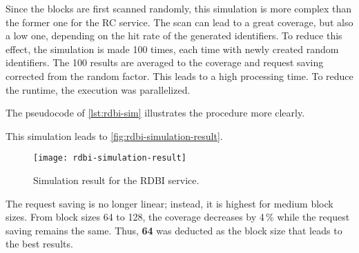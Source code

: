 Since the blocks are first scanned randomly, this simulation is more complex than the former one for the RC service. The scan can lead to a great coverage, but also a low one, depending on the hit rate of the generated identifiers. To reduce this effect, the simulation is made 100 times, each time with newly created random identifiers. The 100 results are averaged to the coverage and request saving corrected from the random factor. This leads to a high processing time. To reduce the runtime, the execution was parallelized.

The pseudocode of \autoref{lst:rdbi-sim} illustrates the procedure more clearly.


This simulation leads to \autoref{fig:rdbi-simulation-result}.

\begin{figure}[htb]
    \centering
    \texttt{[image: rdbi-simulation-result]}
    \caption{Simulation result for the RDBI service.}
    \label{fig:rdbi-simulation-result}
\end{figure}

The request saving is no longer linear; instead, it is highest for medium block sizes. From block sizes 64 to 128, the coverage decreases by 4\,\% while the request saving remains the same. Thus, \textbf{64} was deducted as the block size that leads to the best results.


